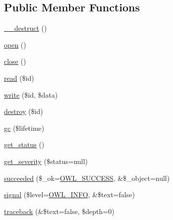 \subsection*{Public Member Functions}
\begin{DoxyCompactItemize}
\item 
\hyperlink{classSessionHandler_a461097c3ee6b1aecf833ce1225d02329}{\_\-\_\-destruct} ()
\item 
\hyperlink{classSessionHandler_a50aa0b123f53d99de350a0eb02b4bfa5}{open} ()
\item 
\hyperlink{classSessionHandler_a335ced83731c7e3e685b7e0df2989c79}{close} ()
\item 
\hyperlink{classSessionHandler_a58cc3e5bf5b14e7bfbc73162de1f5d2b}{read} (\$id)
\item 
\hyperlink{classSessionHandler_ab59071ef0d3deee2472c6916471bd9f5}{write} (\$id, \$data)
\item 
\hyperlink{classSessionHandler_a4e43712ef307979de1b12039ef801adb}{destroy} (\$id)
\item 
\hyperlink{classSessionHandler_ac33097332375ae3f8a43c31cef6db0e8}{gc} (\$lifetime)
\item 
\hyperlink{class__OWL_a99ec771fa2c5c279f80152cc09e489a8}{get\_\-status} ()
\item 
\hyperlink{class__OWL_adf9509ef96858be7bdd9414c5ef129aa}{get\_\-severity} (\$status=null)
\item 
\hyperlink{class__OWL_a53ab4d3bbb2c6a56966c339ca4b4c805}{succeeded} (\$\_\-ok=\hyperlink{owl_8severitycodes_8php_a96223f06ba27bf5cbefa6e9d702897c2}{OWL\_\-SUCCESS}, \&\$\_\-object=null)
\item 
\hyperlink{class__OWL_a51ba4a16409acf2a2f61f286939091a5}{signal} (\$level=\hyperlink{owl_8severitycodes_8php_a139328861128689f2f4def6a399d9057}{OWL\_\-INFO}, \&\$text=false)
\item 
\hyperlink{class__OWL_aa29547995d6741b7d2b90c1d4ea99a13}{traceback} (\&\$text=false, \$depth=0)
\end{DoxyCompactItemize}
